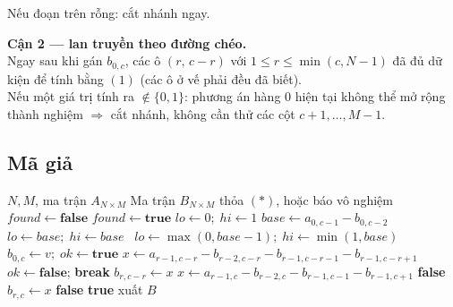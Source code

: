 \documentclass[12pt,a4paper]{article}
\begin{document}
\noindent Nếu đoạn trên rỗng: cắt nhánh ngay.

\textbf{Cận 2 --- lan truyền theo đường chéo.} \\
Ngay sau khi gán $b_{0,c}$, các ô $(r,\, c - r)$ với $1 \le r \le \min(c, N-1)$ đã đủ dữ kiện để tính bằng $(1)$ (các ô ở vế phải đều đã biết). \\
Nếu một giá trị tính ra $\notin \{0, 1\}$: phương án hàng $0$ hiện tại không thể mở rộng thành nghiệm $\Rightarrow$ cắt nhánh, không cần thử các cột $c+1, \dots, M-1$.
\newpage
\subsection{Mã giả}

\begin{algorithm}[H]
\footnotesize
\caption{Giải bài toán Dò Mìn bằng quay lui trên hàng $0$}
\begin{algorithmic}[1]
\Require $N, M$, ma trận $A_{N \times M}$
\Ensure Ma trận $B_{N \times M}$ thỏa $(\ast)$, hoặc báo vô nghiệm
\State $found \gets \textbf{false}$
     \Return \EndIf
         $found \gets \textbf{true}$ \EndIf
        \State \Return
    \EndIf
    \State $lo \gets 0;\; hi \gets 1$
        \State $base \gets a_{0,c-1} - b_{0,c-2}$ 
         $lo \gets base;\; hi \gets base$
        \Else\ $lo \gets \max(0, base - 1);\; hi \gets \min(1, base)$
        \EndIf
         \Return {}
        \EndIf
    \EndIf
        \State $b_{0,c} \gets v;\; ok \gets \textbf{true}$
         
            \State $x \gets a_{r-1,c-r} - b_{r-2,c-r} - b_{r-1,c-r-1} - b_{r-1,c-r+1}$
             $ok \gets \textbf{false}$; \textbf{break} \EndIf
            \State $b_{r,c-r} \gets x$
        \EndFor
          \EndIf
         \Return \EndIf
    \EndFor
\EndProcedure
\Statex
{}
            \State $x \gets a_{r-1,c} - b_{r-2,c} - b_{r-1,c-1} - b_{r-1,c+1}$ 
             \Return \textbf{false} \EndIf
            \State $b_{r,c} \gets x$
        \EndFor
    \EndFor
     
         \Return \textbf{false} \EndIf
    \EndFor
    \State \Return \textbf{true}
\EndFunction
\Statex
\State {}
 xuất $B$ \EndIf
\end{algorithmic}
\end{algorithm}
\end{document}
